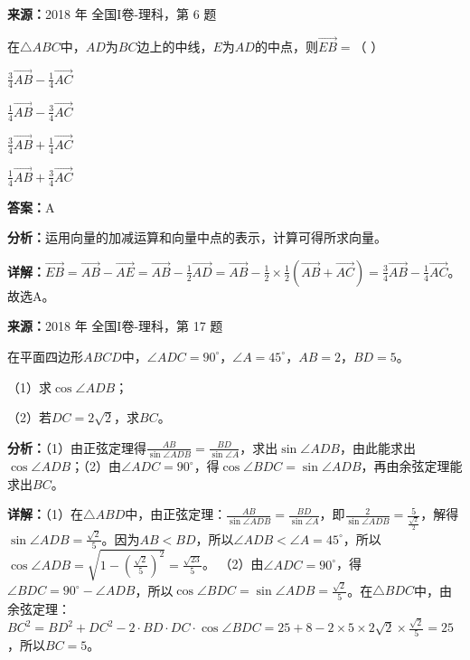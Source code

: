 \begin{question}[points=5]
\textbf{来源：}2018 年 全国I卷-理科，第 6 题\par
在$\triangle ABC$中，$AD$为$BC$边上的中线，$E$为$AD$的中点，则$\overrightarrow{EB}=$（    ）
\begin{choices}
  \item $\frac{3}{4}\overrightarrow{AB}-\frac{1}{4}\overrightarrow{AC}$
  \item $\frac{1}{4}\overrightarrow{AB}-\frac{3}{4}\overrightarrow{AC}$
  \item $\frac{3}{4}\overrightarrow{AB}+\frac{1}{4}\overrightarrow{AC}$
  \item $\frac{1}{4}\overrightarrow{AB}+\frac{3}{4}\overrightarrow{AC}$
\end{choices}
\begin{solution}
\textbf{答案：}A

\textbf{分析：}运用向量的加减运算和向量中点的表示，计算可得所求向量。

\textbf{详解：}$\overrightarrow{EB}=\overrightarrow{AB}-\overrightarrow{AE}=\overrightarrow{AB}-\frac{1}{2}\overrightarrow{AD}=\overrightarrow{AB}-\frac{1}{2}\times\frac{1}{2}(\overrightarrow{AB}+\overrightarrow{AC})=\frac{3}{4}\overrightarrow{AB}-\frac{1}{4}\overrightarrow{AC}$。故选A。
\end{solution}
\end{question}

\begin{question}[points=12]
\textbf{来源：}2018 年 全国I卷-理科，第 17 题\par
在平面四边形$ABCD$中，$\angle ADC=90^\circ$，$\angle A=45^\circ$，$AB=2$，$BD=5$。

（1）求$\cos\angle ADB$；

（2）若$DC=2\sqrt{2}$，求$BC$。
\begin{solution}

\textbf{分析：}（1）由正弦定理得$\frac{AB}{\sin\angle ADB}=\frac{BD}{\sin\angle A}$，求出$\sin\angle ADB$，由此能求出$\cos\angle ADB$；（2）由$\angle ADC=90^\circ$，得$\cos\angle BDC=\sin\angle ADB$，再由余弦定理能求出$BC$。

\textbf{详解：}（1）在$\triangle ABD$中，由正弦定理：$\frac{AB}{\sin\angle ADB}=\frac{BD}{\sin\angle A}$，即$\frac{2}{\sin\angle ADB}=\frac{5}{\frac{\sqrt{2}}{2}}$，解得$\sin\angle ADB=\frac{\sqrt{2}}{5}$。因为$AB<BD$，所以$\angle ADB<\angle A=45^\circ$，所以$\cos\angle ADB=\sqrt{1-(\frac{\sqrt{2}}{5})^2}=\frac{\sqrt{23}}{5}$。
（2）由$\angle ADC=90^\circ$，得$\angle BDC=90^\circ-\angle ADB$，所以$\cos\angle BDC=\sin\angle ADB=\frac{\sqrt{2}}{5}$。在$\triangle BDC$中，由余弦定理：$BC^2=BD^2+DC^2-2\cdot BD\cdot DC\cdot\cos\angle BDC=25+8-2\times5\times2\sqrt{2}\times\frac{\sqrt{2}}{5}=25$，所以$BC=5$。
\end{solution}
\end{question}

